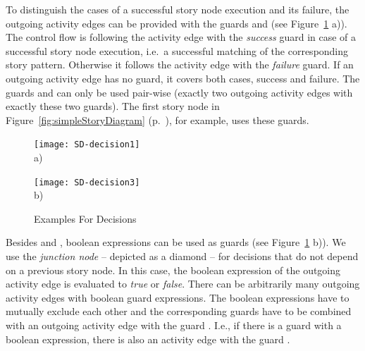 To distinguish the cases of a successful story node execution and its failure,
the outgoing activity edges can be provided with the guards  and  (see Figure~\ref{fig:SD-decisions} a)).
The control flow is following the activity edge with the \emph{success} guard in case of a successful story node execution,
i.e.\ a successful matching of the corresponding story pattern.
Otherwise it follows the activity edge with the \emph{failure} guard.
If an outgoing activity edge has no guard, it covers both cases, success and failure.
The guards  and  can only be used pair-wise (exactly two outgoing activity edges with exactly these two guards).
The first story node in Figure~\ref{fig:simpleStoryDiagram} (p.~\pageref{fig:simpleStoryDiagram}), for example, uses these guards.

\begin{figure}[htb]
	\centering
  \begin{minipage}[t]{.5\textwidth}
    \centering
    \texttt{[image: SD-decision1]}
    \\a)
  \end{minipage}%
  \hfill
  \begin{minipage}[t]{.5\textwidth}
    \centering
    \texttt{[image: SD-decision3]}
    \\b)
  \end{minipage}
  \caption{Examples For Decisions}
  \label{fig:SD-decisions}
\end{figure}

Besides  and , boolean expressions can be used as guards (see Figure~\ref{fig:SD-decisions} b)).
We use the \emph{junction node} -- depicted as a diamond -- for decisions that do not depend on a previous story node.
In this case, the boolean expression of the outgoing activity edge is evaluated to \emph{true} or \emph{false}.
There can be arbitrarily many outgoing activity edges with boolean guard expressions.
The boolean expressions have to mutually exclude each other
and the corresponding guards have to be combined with an outgoing activity edge with the guard .
I.e., if there is a guard with a boolean expression, there is also an activity edge with the guard .

